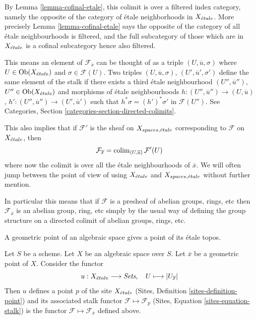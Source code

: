 \noindent
By
Lemma \ref{lemma-cofinal-etale},
this colimit is over a filtered
index category, namely the opposite of the category of \'etale neighborhoods
in $X_{\acute{e}tale}$. More precisely
Lemma \ref{lemma-cofinal-etale}
says the opposite of the category of all \'etale neighbourhoods is filtered,
and the full subcategory of those which are in $X_{\acute{e}tale}$ is a cofinal
subcategory hence also filtered.

\medskip\noindent
This means an element of $\mathcal{F}_{\overline{x}}$ can be
thought of as a triple $(U, \overline{u}, \sigma)$ where
$U \in \mathop{\mathrm{Ob}}\nolimits(X_{\acute{e}tale})$ and $\sigma \in \mathcal{F}(U)$.
Two triples $(U, \overline{u}, \sigma)$, $(U', \overline{u}', \sigma')$
define the same element of the stalk if there exists a third
\'etale neighbourhood
$(U'', \overline{u}'')$, $U'' \in \mathop{\mathrm{Ob}}\nolimits(X_{\acute{e}tale})$
and morphisms of \'etale neighbourhoods
$h : (U'', \overline{u}'') \to (U, \overline{u})$,
$h' : (U'', \overline{u}'') \to (U', \overline{u}')$ such that
$h^*\sigma = (h')^*\sigma'$ in $\mathcal{F}(U'')$. See
Categories, Section \ref{categories-section-directed-colimits}.

\medskip\noindent
This also implies that if $\mathcal{F}'$ is the sheaf on
$X_{spaces, {\acute{e}tale}}$ corresponding to $\mathcal{F}$ on
$X_{\acute{e}tale}$, then
\begin{equation}
\label{equation-stalk-spaces-etale}
\mathcal{F}_{\overline{x}} = \mathop{\mathrm{colim}}\nolimits_{(U, \overline{u})} \mathcal{F}'(U)
\end{equation}
where now the colimit is over all the \'etale neighbourhoods of $\overline{x}$.
We will often jump between the point of view of using $X_{\acute{e}tale}$
and $X_{spaces, {\acute{e}tale}}$ without further mention.

\medskip\noindent
In particular this means that if $\mathcal{F}$ is a presheaf of
abelian groups, rings, etc then $\mathcal{F}_{\overline{x}}$ is
an abelian group, ring, etc simply by the usual way of defining the
group structure on a directed colimit of abelian groups, rings, etc.

\begin{lemma}
\label{lemma-stalk-gives-point}
\begin{slogan}
A geometric point of an algebraic space gives a point of its \'etale topos.
\end{slogan}
Let $S$ be a scheme.
Let $X$ be an algebraic space over $S$.
Let $\overline{x}$ be a geometric point of $X$.
Consider the functor
$$
u : X_{\acute{e}tale} \longrightarrow \textit{Sets}, \quad
U \longmapsto |U_{\overline{x}}|
$$
Then $u$ defines a point $p$ of the site $X_{\acute{e}tale}$
(Sites, Definition \ref{sites-definition-point})
and its associated stalk functor $\mathcal{F} \mapsto \mathcal{F}_p$
(Sites, Equation \ref{sites-equation-stalk})
is the functor $\mathcal{F} \mapsto \mathcal{F}_{\overline{x}}$
defined above.
\end{lemma}

